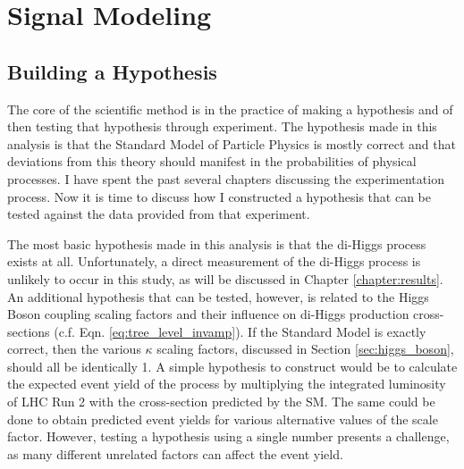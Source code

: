 \chapter{Signal Modeling} \label{chapter:signal}

\section{Building a Hypothesis}

    The core of the scientific method is in the practice of making a hypothesis
        and of then testing that hypothesis through experiment.
    The hypothesis made in this analysis is that the Standard Model of Particle Physics is mostly correct
        and that deviations from this theory should manifest in the probabilities of physical processes.
    I have spent the past several chapters discussing the experimentation process.
    Now it is time to discuss how I constructed a hypothesis that can be tested against the data provided from that experiment.

    The most basic hypothesis made in this analysis is that the di-Higgs process exists at all.
    Unfortunately, a direct measurement of the di-Higgs process is unlikely to occur in this study, as will be discussed in Chapter \ref{chapter:results}.
    An additional hypothesis that can be tested, however,
        is related to the Higgs Boson coupling scaling factors and their influence on di-Higgs production cross-sections
        (c.f. Eqn. \ref{eq:tree_level_invamp}).
    If the Standard Model is exactly correct, then the various $\kappa$ scaling factors,
        discussed in Section \ref{sec:higgs_boson},
        should all be identically 1.
    A simple hypothesis to construct would be to calculate the expected event yield of the \vbfproc process
        by multiplying the integrated luminosity of LHC Run 2 with the cross-section predicted by the SM.
    The same could be done to obtain predicted event yields for various alternative values of the scale factor.
    However, testing a hypothesis using a single number presents a challenge, as many different unrelated factors can affect the event yield.


